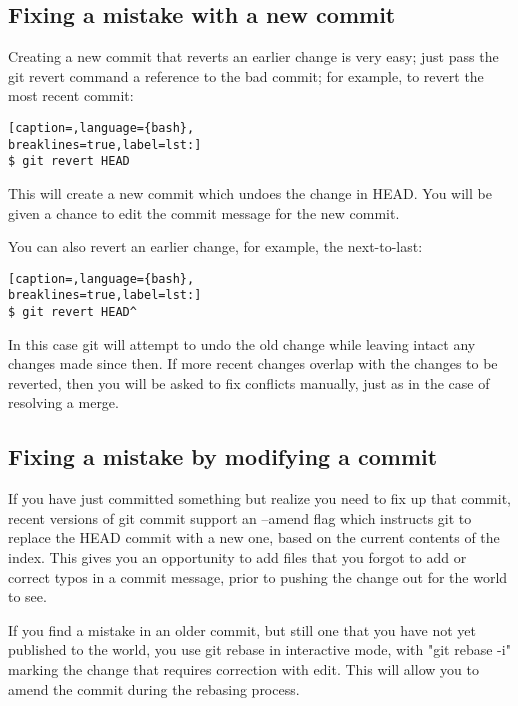 \subsection{Fixing a mistake with a new commit}
Creating a new commit that reverts an earlier change is very easy; just pass
the git revert command a reference to the bad commit; for example, to revert
the most recent commit:
\lstset{basicstyle=\scriptsize, numbers=none, captionpos=b, tabsize=4}
\begin{lstlisting}[caption=,language={bash},
breaklines=true,label=lst:]
$ git revert HEAD
\end{lstlisting}

This will create a new commit which undoes the change in HEAD. You will be
given a chance to edit the commit message for the new commit.

You can also revert an earlier change, for example, the next-to-last:
\lstset{basicstyle=\scriptsize, numbers=none, captionpos=b, tabsize=4}
\begin{lstlisting}[caption=,language={bash},
breaklines=true,label=lst:]
$ git revert HEAD^
\end{lstlisting}

In this case git will attempt to undo the old change while leaving intact any
changes made since then. If more recent changes overlap with the changes to be
reverted, then you will be asked to fix conflicts manually, just as in the case
of resolving a merge.

\subsection{Fixing a mistake by modifying a commit}
If you have just committed something but realize you need to fix up that
commit, recent versions of git commit support an --amend flag which instructs
git to replace the HEAD commit with a new one, based on the current contents of
the index. This gives you an opportunity to add files that you forgot to add or
correct typos in a commit message, prior to pushing the change out for the
world to see.

If you find a mistake in an older commit, but still one that you have not yet
published to the world, you use git rebase in interactive mode, with "git
rebase -i" marking the change that requires correction with edit. This will
allow you to amend the commit during the rebasing process.
